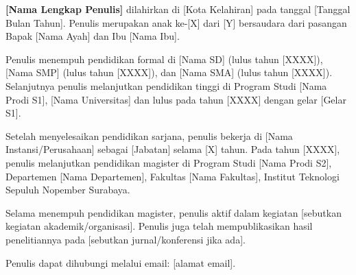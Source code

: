 
\begin{biography}

\begin{minipage}[t]{0.3\textwidth}
    \vspace{0pt}
\end{minipage}
\hfill
\begin{minipage}[t]{0.65\textwidth}
    \vspace{0pt}
    \textbf{[Nama Lengkap Penulis]} dilahirkan di [Kota Kelahiran] pada tanggal [Tanggal Bulan Tahun]. Penulis merupakan anak ke-[X] dari [Y] bersaudara dari pasangan Bapak [Nama Ayah] dan Ibu [Nama Ibu].
\end{minipage}

\vspace{1cm}

Penulis menempuh pendidikan formal di [Nama SD] (lulus tahun [XXXX]), [Nama SMP] (lulus tahun [XXXX]), dan [Nama SMA] (lulus tahun [XXXX]). Selanjutnya penulis melanjutkan pendidikan tinggi di Program Studi [Nama Prodi S1], [Nama Universitas] dan lulus pada tahun [XXXX] dengan gelar [Gelar S1].

Setelah menyelesaikan pendidikan sarjana, penulis bekerja di [Nama Instansi/Perusahaan] sebagai [Jabatan] selama [X] tahun. Pada tahun [XXXX], penulis melanjutkan pendidikan magister di Program Studi [Nama Prodi S2], Departemen [Nama Departemen], Fakultas [Nama Fakultas], Institut Teknologi Sepuluh Nopember Surabaya.

Selama menempuh pendidikan magister, penulis aktif dalam kegiatan [sebutkan kegiatan akademik/organisasi]. Penulis juga telah mempublikasikan hasil penelitiannya pada [sebutkan jurnal/konferensi jika ada].

Penulis dapat dihubungi melalui email: [alamat email].

\end{biography}
